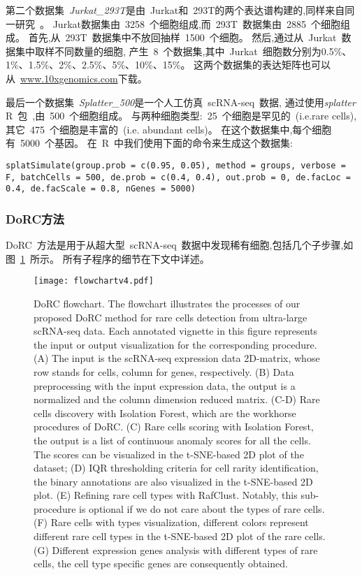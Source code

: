 第二个数据集~\textit{Jurkat\_293T}是由~Jurkat和~293T的两个表达谱构建的,同样来自同一研究~\cite{zheng2017massively}。
Jurkat数据集由~3258~个细胞组成,而~293T~数据集由~2885~个细胞组成。
首先,从~293T~数据集中不放回抽样~1500~个细胞。
然后,通过从~Jurkat~数据集中取样不同数量的细胞,
产生~8~个数据集,其中~Jurkat~细胞数分别为0.5\%、1\%、1.5\%、2\%、2.5\%、5\%、10\%、15\%。
这两个数据集的表达矩阵也可以从~\url{www.10xgenomics.com}下载。

最后一个数据集~\textit{Splatter\_500}是一个人工仿真~scRNA-seq~数据,
通过使用\textit{splatter} R~包~\cite{zappia2017splatter},由~500~个细胞组成。
与两种细胞类型:~25~个细胞是罕见的~(i.e.rare cells),其它~475~个细胞是丰富的~(i.e. abundant cells)。
在这个数据集中,每个细胞有~5000~个基因。
在~R~中我们使用下面的命令来生成这个数据集:

\texttt{splatSimulate(group.prob = c(0.95, 0.05), method = groups, 
verbose = F, batchCells = 500, de.prob = c(0.4, 0.4), out.prob = 0, 
de.facLoc = 0.4, de.facScale = 0.8, nGenes = 5000)}

\subsubsection{DoRC方法}
DoRC~方法是用于从超大型~scRNA-seq~数据中发现稀有细胞,包括几个子步骤,如图~\ref{fig:flowchart}~所示。
所有子程序的细节在下文中详述。
\begin{figure}[!htbp]
    \centering
    \texttt{[image: flowchartv4.pdf]}
    \caption{DoRC flowchart. The flowchart illustrates the processes of our proposed DoRC method for rare cells detection from ultra-large scRNA-seq data. 
    Each annotated vignette in this figure represents the input or output visualization for the corresponding procedure. 
    (A) The input is the scRNA-seq expression data 2D-matrix, whose row stands for cells, column for genes, respectively.
    (B) Data preprocessing with the input expression data, the output is  a normalized and the column dimension reduced matrix. 
    (C-D) Rare cells discovery with Isolation Forest, which are the workhorse procedures of DoRC. 
    (C) Rare cells scoring with Isolation Forest, the output is a list of continuous anomaly scores for all the cells.
    The scores can be visualized in the t-SNE-based 2D plot of the dataset; 
    (D) IQR thresholding criteria for cell rarity identification, the binary annotations are also visualized in the t-SNE-based 2D plot.
    (E) Refining rare cell types with RafClust. Notably, this sub-procedure is optional if we do not care about the types of rare cells.
    (F) Rare cells with types visualization, different colors represent different rare cell types in the t-SNE-based 2D plot of the rare cells.
    (G) Different expression genes analysis with different types of rare cells, the cell type specific genes are consequently obtained. 
    }
    \label{fig:flowchart}
\end{figure}

